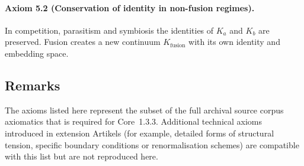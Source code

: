 \paragraph{Axiom 5.2 (Conservation of identity in non-fusion regimes).}
In competition, parasitism and symbiosis the identities of \(K_a\) and \(K_b\)
are preserved.  Fusion creates a new continuum \(K_{\mathrm{fusion}}\) with its
own identity and embedding space.

\subsection{Remarks}

The axioms listed here represent the subset of the full archival source corpus axiomatics
that is required for Core~1.3.3.  Additional technical axioms introduced in
extension Artikels (for example, detailed forms of structural tension, specific
boundary conditions or renormalisation schemes) are compatible with this list
but are not reproduced here.
